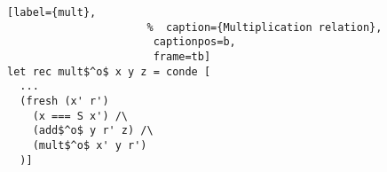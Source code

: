 \begin{figure}[!t]
  \centering
  \begin{minipage}{\columnwidth}
    \begin{lstlisting}[label={mult},
                      %  caption={Multiplication relation},
                       captionpos=b,
                       frame=tb]
let rec mult$^o$ x y z = conde [
  ...
  (fresh (x' r')
    (x === S x') /\
    (add$^o$ y r' z) /\
    (mult$^o$ x' y r')
  )]
    \end{lstlisting}
  \end{minipage}
\end{figure}
